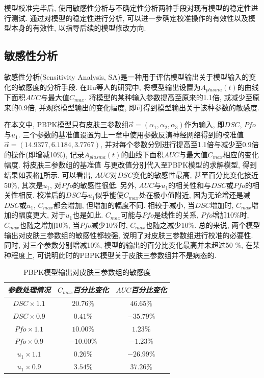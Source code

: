 \documentclass[a4paper,punct=banjiao,twoside]{ctexrep}
\theoremstyle{plain}
\theoremstyle{definition}
\theoremstyle{remark}
\begin{document}
模型校准完毕后, 使用敏感性分析与不确定性分析两种手段对现有模型的稳定性进行测试. 通过对模型的稳定性进行分析, 可以进一步确定校准操作的有效性以及模型本身的有效性, 以指导后续的模型修改方向.
\subsection{敏感性分析}

敏感性分析(Sensitivity Analysis, SA)是一种用于评估模型输出关于模型输入的变化的敏感度的分析手段\cite{29}.
在Hu等人\cite{11}的研究中, 将模型输出设置为$A_{plasma}(t)$的曲线下面积$AUC$与最大值$C_{max}$. 将模型的某种输入参数提高至原来的1.1倍, 或减少至原来的0.9倍, 并观察模型输出的变化幅度, 
即可得到模型输出关于该种参数的敏感度.

在本文中, PBPK模型只有皮肤三参数组$\vec{\alpha}=(\alpha_1,\alpha_2,\alpha_3)$作为输入, 即$DSC$, $Pfo$与$u_1$. 三个参数的基准值设置为上一章中使用参数反演神经网络得到的校准值
$\vec{\alpha}=(14.9377,  6.1184,  3.7767)$, 并对每个参数分别进行提高至1.1倍与减少至0.9倍的操作(即增减10\%), 记录$A_{plasma}(t)$的曲线下面积$AUC$与最大值$C_{max}$相应的变化幅度. 将皮肤三参数组的基准值
与更改值分别代入至PBPK模型的求解模型, 得到结果如表格\ref{tab9}所示. 可以看出, $AUC$对$DSC$变化的敏感性最高, 甚至百分比变化接近$50\%$, 其次是$u_1$, 对$Pfo$的敏感性很低. 另外, $AUC$与$u_1$的相关性和与$DSC$或$Pfo$的相关性相反.
校准后的$DSC$与$u_1$似乎能使$C_{max}$处在极小值附近, 因为无论增还是减$DSC$或$u_1$, $C_{max}$都会增加, 但增加的幅度不同. 相较于减小, 当$DSC$增加时, $C_{max}$增加的幅度更大, 对于$u_1$也是如此.
$C_{max}$可能与$Pfo$是线性的关系, $Pfo$增加10\%时, $C_{max}$也随之增加10\%, 当$Pfo$减少10\%时, $C_{max}$也随之减少10\%. 总的来说, 两个模型输出对皮肤三参数组的敏感性都较强, 说明了对皮肤三参数组进行校准的必要性.
同时, 对三个参数分别增减10\%, 模型的输出的百分比变化最高并未超过50 \%, 在某种程度上, 可说明此时的PBPK模型关于皮肤三参数组并不是病态的.

\begin{table}[htbp]
  \centering
  \begin{tabular}[t]{c*{2}{c}}
    \hline
    \textit{参数处理情况} &$C_{max}$\textit{百分比变化}  &$AUC$\textit{百分比变化}\\
    \hline
    $DSC\times1.1$ & $  20.76\%$ & $ 46.65 \%$  \\ 
    $DSC\times0.9$ & $  0.41\%$ &$  -35.79 \%$   \\ 
    $Pfo\times1.1$ & $  10.00\%$ &$   1.23 \%$   \\ 
    $Pfo\times0.9$ & $  -10.00\%$ &$    -1.23\%$  \\ 
    $u_1\times1.1$ & $  0.26\%$ &$   -26.99 \%$   \\ 
    $u_1\times0.9$ & $  3.54\%$ &$   37.26 \%$  \\ 
    \hline
  \end{tabular}
  \caption{\label{tab9}PBPK模型输出对皮肤三参数组的敏感度} 
\end{table}  
\end{document}
